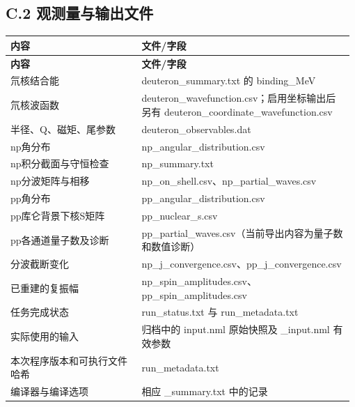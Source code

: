 \documentclass[UTF8,a4paper,zihao=5,fontset=fandol]{ctexart}
\begin{document}
\subsection*{C.2 观测量与输出文件}

{\small\setlength{\tabcolsep}{3pt}\renewcommand{\arraystretch}{1.28}
\begin{longtable}{@{}>{\raggedright\arraybackslash}p{0.3705\linewidth}>{\raggedright\arraybackslash}p{0.6045\linewidth}@{}}\toprule
\textbf{内容} & \textbf{文件/字段}\\\midrule
\endfirsthead
\textbf{内容} & \textbf{文件/字段}\\\midrule
\endhead
氘核结合能 & {\ttfamily\small deuteron\_\allowbreak{}summary.\allowbreak{}txt} 的 {\ttfamily\small binding\_\allowbreak{}MeV}\\
氘核波函数 & {\ttfamily\small deuteron\_\allowbreak{}wavefunction.\allowbreak{}csv}；启用坐标输出后另有 {\ttfamily\small deuteron\_\allowbreak{}coordinate\_\allowbreak{}wavefunction.\allowbreak{}csv}\\
半径、Q、磁矩、尾参数 & {\ttfamily\small deuteron\_\allowbreak{}observables.\allowbreak{}dat}\\
np角分布 & {\ttfamily\small np\_\allowbreak{}angular\_\allowbreak{}distribution.\allowbreak{}csv}\\
np积分截面与守恒检查 & {\ttfamily\small np\_\allowbreak{}summary.\allowbreak{}txt}\\
np分波矩阵与相移 & {\ttfamily\small np\_\allowbreak{}on\_\allowbreak{}shell.\allowbreak{}csv}、{\ttfamily\small np\_\allowbreak{}partial\_\allowbreak{}waves.\allowbreak{}csv}\\
pp角分布 & {\ttfamily\small pp\_\allowbreak{}angular\_\allowbreak{}distribution.\allowbreak{}csv}\\
pp库仑背景下核S矩阵 & {\ttfamily\small pp\_\allowbreak{}nuclear\_\allowbreak{}s.\allowbreak{}csv}\\
pp各通道量子数及诊断 & {\ttfamily\small pp\_\allowbreak{}partial\_\allowbreak{}waves.\allowbreak{}csv}（当前导出内容为量子数和数值诊断）\\
分波截断变化 & {\ttfamily\small np\_\allowbreak{}j\_\allowbreak{}convergence.\allowbreak{}csv}、{\ttfamily\small pp\_\allowbreak{}j\_\allowbreak{}convergence.\allowbreak{}csv}\\
已重建的复振幅 & {\ttfamily\small np\_\allowbreak{}spin\_\allowbreak{}amplitudes.\allowbreak{}csv}、{\ttfamily\small pp\_\allowbreak{}spin\_\allowbreak{}amplitudes.\allowbreak{}csv}\\
任务完成状态 & {\ttfamily\small run\_\allowbreak{}status.\allowbreak{}txt} 与 {\ttfamily\small run\_\allowbreak{}metadata.\allowbreak{}txt}\\
实际使用的输入 & 归档中的 {\ttfamily\small input.\allowbreak{}nml} 原始快照及 {\ttfamily\small *\_\allowbreak{}input.\allowbreak{}nml} 有效参数\\
本次程序版本和可执行文件哈希 & {\ttfamily\small run\_\allowbreak{}metadata.\allowbreak{}txt}\\
编译器与编译选项 & 相应 {\ttfamily\small *\_\allowbreak{}summary.\allowbreak{}txt} 中的记录\\
\bottomrule\end{longtable}}
\end{document}
